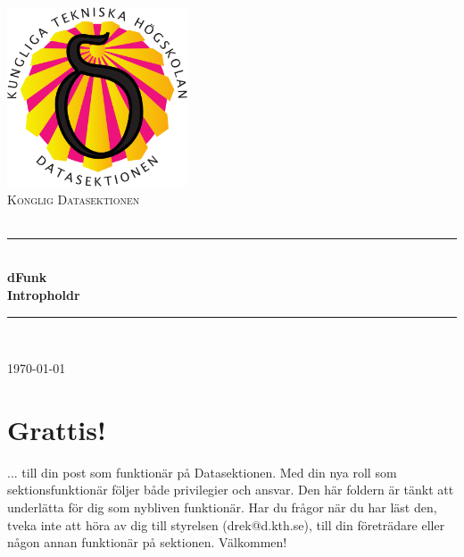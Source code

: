 \documentclass[a4paper,11pt]{article}
\title{\MyTitle}
\author{D-rektoratet}
\date{\today}
\newcommand{\HRule}{\rule{\linewidth}{0.5mm}}
\newcommand{\Subject}{}
\newcommand{\MyTitle}{Intropholdr}
\newcommand{\MySubTitle}{dFunk}
\begin{document}
\begin{titlepage}
\begin{center}

\includegraphics[width=0.4\textwidth]{../skold.pdf}\\[1cm]

\textsc{\LARGE Konglig Datasektionen}\\[0.5cm]

\textsc{\Large \Subject}\\[0.5cm]


\HRule \\[0.7cm]
{ \huge \bfseries \MySubTitle}\\[0.4cm]
{ \huge \bfseries \MyTitle}\\[0.4cm]

\HRule \\[0.7cm]

\vfill

{\large \today}

\end{center}
\end{titlepage}


\tableofcontents
\pagebreak

\section{Grattis!}
... till din post som funktionär på Datasektionen. Med din nya roll som sektionsfunktionär följer både privilegier och ansvar. Den här foldern är tänkt att underlätta för dig som nybliven funktionär. Har du frågor när du har läst den, tveka inte att höra av dig till styrelsen (drek@d.kth.se), till din företrädare eller någon annan funktionär på sektionen. Välkommen!
\end{document}
